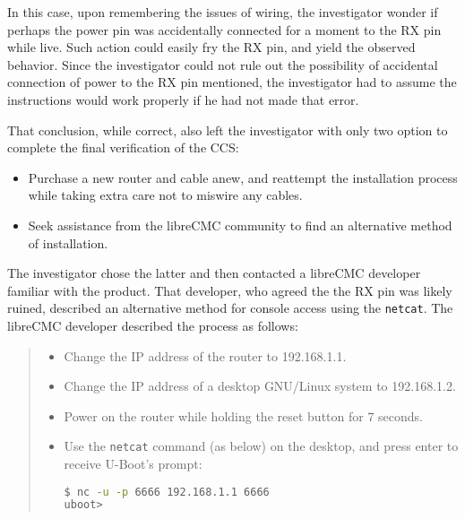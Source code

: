 In this case, upon remembering the issues of wiring, the investigator wonder
if perhaps the power pin was accidentally connected for a moment to the RX
pin while live.  Such action could easily fry the RX pin, and yield the
observed behavior.  Since the investigator could not rule out the possibility
of accidental connection of power to the RX pin mentioned, the investigator
had to assume the instructions would work properly if he had not made that
error.

That conclusion, while correct, also left the investigator with only two
option to complete the final verification of the CCS:

\begin{itemize}

   \item Purchase a new router and cable anew, and reattempt the installation
     process while taking extra care not to miswire any cables.

   \item Seek assistance from the libreCMC community to find an alternative
     method of installation.

\end{itemize}

The investigator chose the latter and then contacted a libreCMC developer
familiar with the product.  That developer, who  agreed the the RX pin was
likely ruined, described an alternative method for console access using the
{\tt netcat}.  The libreCMC developer described the process as follows:

\begin{quotation}

  \begin{itemize}

  \item Change the IP address of the router to 192.168.1.1.

  \item Change the IP address of a desktop GNU/Linux system to 192.168.1.2.

  \item Power on the router while holding the reset button for 7 seconds.

  \item Use the {\tt netcat} command (as below) on the desktop, and press
    enter to receive U-Boot's prompt:
    
\lstset{tabsize=2}
\begin{lstlisting}[language=bash]
$ nc -u -p 6666 192.168.1.1 6666
uboot>
\end{lstlisting}
  \end{itemize}
\end{quotation}

